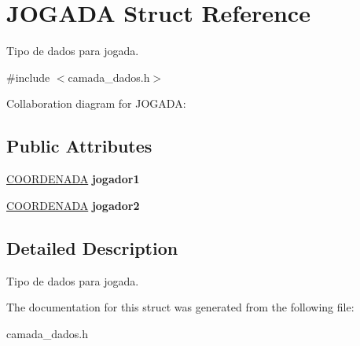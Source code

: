 \hypertarget{structJOGADA}{}\section{J\+O\+G\+A\+DA Struct Reference}
\label{structJOGADA}


Tipo de dados para jogada.  




{\ttfamily \#include $<$camada\+\_\+dados.\+h$>$}



Collaboration diagram for J\+O\+G\+A\+DA\+:
\subsection*{Public Attributes}
\begin{DoxyCompactItemize}
\item 
\mbox{\label{structJOGADA_a93d9306cb0c49b66b7d9a615bffe0149}} 
\hyperlink{structCOORDENADA}{C\+O\+O\+R\+D\+E\+N\+A\+DA} {\bfseries jogador1}
\item 
\mbox{\label{structJOGADA_ab46b16dfbdc7f2af9430c8dcdac0914b}} 
\hyperlink{structCOORDENADA}{C\+O\+O\+R\+D\+E\+N\+A\+DA} {\bfseries jogador2}
\end{DoxyCompactItemize}


\subsection{Detailed Description}
Tipo de dados para jogada. 

The documentation for this struct was generated from the following file\+:\begin{DoxyCompactItemize}
\item 
camada\+\_\+dados.\+h\end{DoxyCompactItemize}
